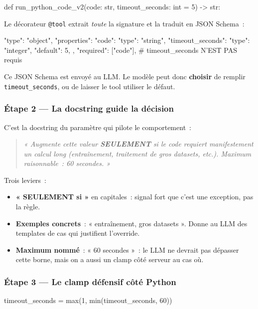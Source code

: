 \documentclass[11pt,a4paper]{article}
\begin{document}
\begin{pythoncode}
def run_python_code_v2(code: str, timeout_seconds: int = 5) -> str:
\end{pythoncode}

Le décorateur \texttt{@tool} extrait \emph{toute} la signature et la
traduit en JSON Schema~:

\begin{pythoncode}
{
    "type": "object",
    "properties": {
        "code": {"type": "string"},
        "timeout_seconds": {"type": "integer", "default": 5},
    },
    "required": ["code"],     # timeout_seconds N'EST PAS requis
}
\end{pythoncode}

Ce JSON Schema est envoyé au LLM. Le modèle peut donc \textbf{choisir}
de remplir \texttt{timeout\_seconds}, ou de laisser le tool utiliser le
défaut.

\subsubsection*{Étape 2 — La docstring guide la décision}

C'est la docstring du paramètre qui pilote le comportement~:

\begin{quote}\itshape
« Augmente cette valeur \textbf{SEULEMENT} si le code requiert
manifestement un calcul long (entraînement, traitement de gros datasets,
etc.). Maximum raisonnable~: 60 secondes. »
\end{quote}

Trois leviers~:
\begin{itemize}[leftmargin=*]
  \item \textbf{« SEULEMENT si »} en capitales~: signal fort que c'est
        une exception, pas la règle.
  \item \textbf{Exemples concrets}~: « entraînement, gros datasets ».
        Donne au LLM des templates de cas qui justifient l'override.
  \item \textbf{Maximum nommé}~: « 60 secondes »~: le LLM ne devrait
        pas dépasser cette borne, mais on a aussi un clamp côté serveur
        au cas où.
\end{itemize}

\subsubsection*{Étape 3 — Le clamp défensif côté Python}

\begin{pythoncode}
timeout_seconds = max(1, min(timeout_seconds, 60))
\end{pythoncode}
\end{document}
